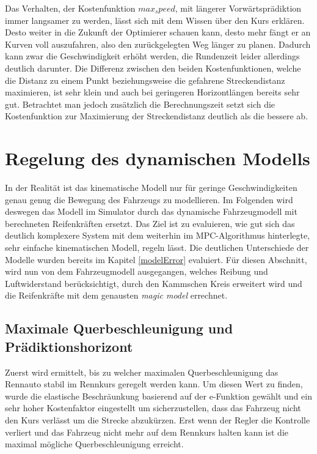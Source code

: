 \documentclass{like}
\begin{document}
Das Verhalten, der Kostenfunktion $max_speed$, mit längerer Vorwärtsprädiktion immer langsamer zu werden, lässt sich mit dem Wissen über den Kurs erklären. Desto weiter in die Zukunft der Optimierer schauen kann, desto mehr fängt er an Kurven voll auszufahren, also den zurückgelegten Weg länger zu planen. Dadurch kann zwar die Geschwindigkeit erhöht werden, die Rundenzeit leider allerdings deutlich darunter. 
Die Differenz zwischen den beiden Kostenfunktionen, welche die Distanz zu einem Punkt beziehungsweise die gefahrene Streckendistanz maximieren, ist sehr klein und auch bei geringeren Horizontlängen bereits sehr gut. Betrachtet man jedoch zusätzlich die Berechnungszeit setzt sich die Kostenfunktion zur Maximierung der Streckendistanz deutlich als die bessere ab.


\newpage
\chapter{Regelung des dynamischen Modells}
\label{dynModelcontrol}
In der Realität ist das kinematische Modell nur für geringe Geschwindigkeiten genau genug die Bewegung des Fahrzeugs zu modellieren. Im Folgenden wird deswegen das Modell im Simulator durch das dynamische Fahrzeugmodell mit berechneten Reifenkräften ersetzt. Das Ziel ist zu evaluieren, wie gut sich das deutlich komplexere System mit dem weiterhin im \ac{MPC}-Algorithmus hinterlegte, sehr einfache kinematischen Modell, regeln lässt.
Die deutlichen Unterschiede der Modelle wurden bereits im Kapitel \ref{modelError} evaluiert. Für diesen Abschnitt, wird nun von dem Fahrzeugmodell ausgegangen, welches Reibung und Luftwiderstand berücksichtigt, durch den Kammschen Kreis erweitert wird und die Reifenkräfte mit dem genausten \emph{magic model} errechnet.

\section{Maximale Querbeschleunigung und Prädiktionshorizont}
Zuerst wird ermittelt, bis zu welcher maximalen Querbeschleunigung das Rennauto stabil im Rennkurs geregelt werden kann. Um diesen Wert zu finden, wurde die elastische Beschräunkung basierend auf der e-Funktion gewählt und ein sehr hoher Kostenfaktor eingestellt um sicherzustellen, dass das Fahrzeug nicht den Kurs verlässt um die Strecke abzukürzen. Erst wenn der Regler die Kontrolle verliert und das Fahrzeug nicht mehr auf dem Rennkurs halten kann ist die maximal mögliche Querbeschleunigung erreicht.
\end{document}
